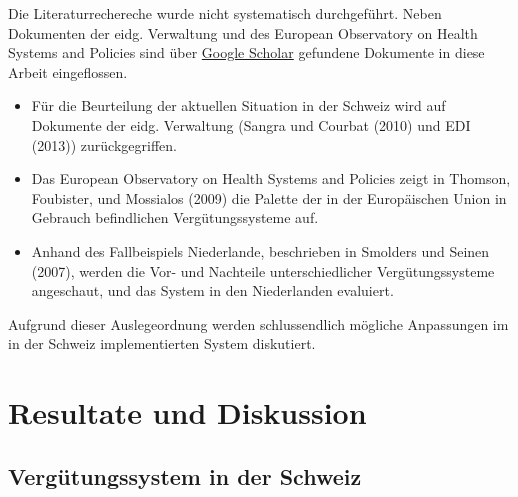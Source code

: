 \documentclass[ngerman,a4paper]{article}
\providecommand{\tightlist}{%
  \setlength{\itemsep}{0pt}\setlength{\parskip}{0pt}}
\begin{document}
Die Literaturrechereche wurde nicht systematisch durchgeführt. Neben
Dokumenten der eidg. Verwaltung und des European Observatory on Health
Systems and Policies sind über \href{scholar.google.ch}{Google Scholar}
gefundene Dokumente in diese Arbeit eingeflossen.

\begin{itemize}
\tightlist
\item
  Für die Beurteilung der aktuellen Situation in der Schweiz wird auf
  Dokumente der eidg. Verwaltung (Sangra und Courbat (2010) und EDI
  (2013)) zurückgegriffen.\\
\item
  Das European Observatory on Health Systems and Policies zeigt in
  Thomson, Foubister, und Mossialos (2009) die Palette der in der
  Europäischen Union in Gebrauch befindlichen Vergütungssysteme auf.\\
\item
  Anhand des Fallbeispiels Niederlande, beschrieben in Smolders und
  Seinen (2007), werden die Vor- und Nachteile unterschiedlicher
  Vergütungssysteme angeschaut, und das System in den Niederlanden
  evaluiert.
\end{itemize}

Aufgrund dieser Auslegeordnung werden schlussendlich mögliche
Anpassungen im in der Schweiz implementierten System diskutiert.

\section{Resultate und Diskussion}\label{resultate-und-diskussion}

\subsection{Vergütungssystem in der
Schweiz}\label{vergutungssystem-in-der-schweiz}
\end{document}
